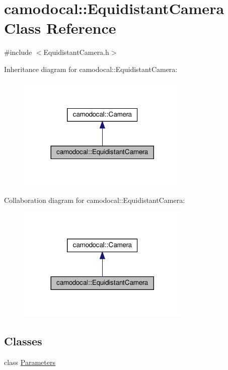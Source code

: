 \hypertarget{classcamodocal_1_1EquidistantCamera}{}\section{camodocal\+:\+:Equidistant\+Camera Class Reference}
\label{classcamodocal_1_1EquidistantCamera}


{\ttfamily \#include $<$Equidistant\+Camera.\+h$>$}



Inheritance diagram for camodocal\+:\+:Equidistant\+Camera\+:\nopagebreak
\begin{figure}[H]
\begin{center}
\leavevmode
\includegraphics[width=233pt]{classcamodocal_1_1EquidistantCamera__inherit__graph}
\end{center}
\end{figure}


Collaboration diagram for camodocal\+:\+:Equidistant\+Camera\+:\nopagebreak
\begin{figure}[H]
\begin{center}
\leavevmode
\includegraphics[width=233pt]{classcamodocal_1_1EquidistantCamera__coll__graph}
\end{center}
\end{figure}
\subsection*{Classes}
\begin{DoxyCompactItemize}
\item 
class \hyperlink{classcamodocal_1_1EquidistantCamera_1_1Parameters}{Parameters}
\end{DoxyCompactItemize}
